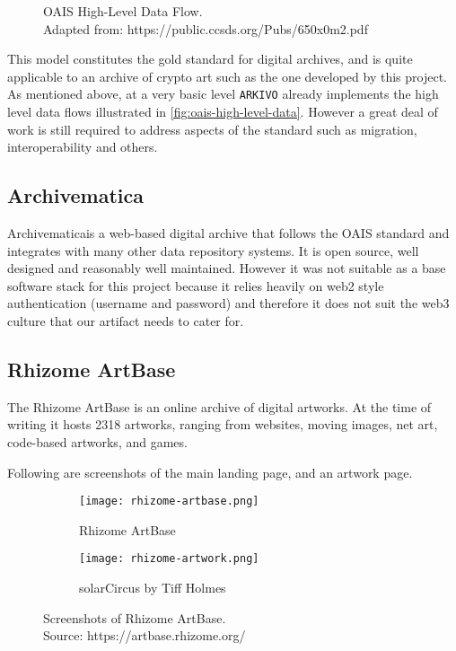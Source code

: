 \begin{figure}[h]
    \centering
    \captionsetup{justification=centering}
    
    \caption[OAIS High-Level Data Flow]{OAIS High-Level Data Flow. \\ Adapted from: https://public.ccsds.org/Pubs/650x0m2.pdf}
    \label{fig:oais-high-level-data}
\end{figure}

This model constitutes the gold standard for digital archives, and is quite applicable to an archive of crypto art such as the one developed by this project. As mentioned above, at a very basic level \texttt{ARKIVO} already implements the high level data flows illustrated in \autoref{fig:oais-high-level-data}. However a great deal of work is still required to address aspects of the standard such as migration, interoperability and others.

\subsection{Archivematica}

Archivematica\footnotemark[9] is a web-based digital archive that follows the OAIS standard and integrates with many other data repository systems. It is open source, well designed and reasonably well maintained. However it was not suitable as a base software stack for this project because it relies heavily on web2 style authentication (username and password) and therefore it does not suit the web3 culture that our artifact needs to cater for.


\subsection{Rhizome ArtBase}

The Rhizome ArtBase is an online archive of digital artworks. At the time of writing it hosts 2318 artworks, ranging from websites, moving images, net art, code-based artworks, and games.

Following are screenshots of the main landing page, and an artwork page.


\begin{figure}[H]
  \centering
  \captionsetup{justification=centering}
  \begin{subfigure}[b]{0.45\textwidth}
    \centering
    \texttt{[image: rhizome-artbase.png]}
    \caption{Rhizome ArtBase}
    \label{fig:image1}
  \end{subfigure}
  \hfill
  \begin{subfigure}[b]{0.45\textwidth}
    \centering
    \texttt{[image: rhizome-artwork.png]}
    \caption{solarCircus by Tiff Holmes}
    \label{fig:image2}
  \end{subfigure}
  \caption[Screenshots of Rhizome ArtBase]{Screenshots of Rhizome ArtBase. \\ Source: https://artbase.rhizome.org/}
  \label{fig:rhizome-screens}
\end{figure}


